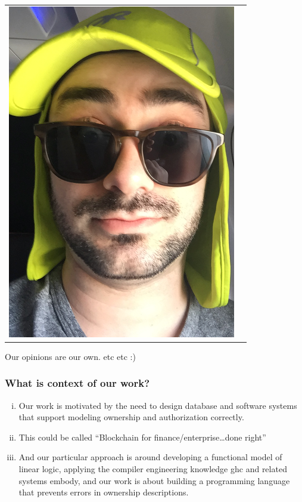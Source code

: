\documentclass[11pt,reqno]{beamer}
\begin{document}
\begin{frame}
\begin{centering}
\begin{tabular}{l|r}
  \includegraphics[scale=0.22]{../joelpics/IMG_4133.png}
\end{tabular}
\end{centering}

Our opinions are our own. etc etc :)
\end{frame}

\begin{frame}\frametitle{What is context of our work?}
\begin{enumerate}[(i)]
  \item Our work is motivated by the need to design database and software systems
  that support modeling ownership and authorization correctly.
  \item This could be called ``Blockchain for finance/enterprise\ldots done right''
  \item And our particular approach is around developing a functional model
  of linear logic, applying the compiler engineering knowledge ghc and related
  systems embody, and our work is about building a programming language
  that prevents errors in ownership descriptions.
\end{enumerate}
\end{frame}
\end{document}
